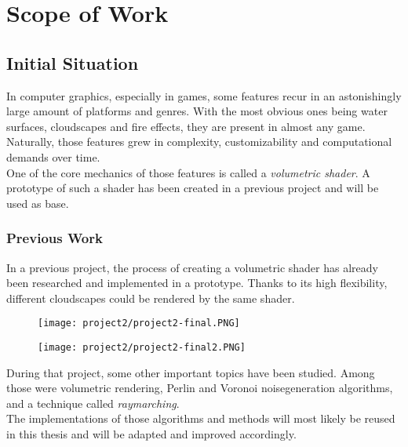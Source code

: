 \section{Scope of Work}

\subsection{Initial Situation}
In computer graphics, especially in games, some features recur in an astonishingly large amount of platforms and genres.
With the most obvious ones being water surfaces, cloudscapes and fire effects, they are present in almost any game. 
Naturally, those features grew in complexity, customizability and computational demands over time.
\\
One of the core mechanics of those features is called a \emph{\gls{volumetric} \gls{shader}}.
A prototype of such a \gls{shader} has been created in a previous project and will be used as base.

\subsubsection{Previous Work}
In a previous project, the process of creating a \gls{volumetric} \gls{shader} has already been researched and implemented in a prototype. Thanks to its high flexibility, different cloudscapes could be rendered by the same shader.

\begin{figure}[ht]
    \centering
        \begin{minipage}{0.47\linewidth}
            \texttt{[image: project2/project2-final.PNG]}
        \end{minipage}
    \hfill
        \begin{minipage}{0.47\linewidth}
            \texttt{[image: project2/project2-final2.PNG]}
        \end{minipage}  
\end{figure}

\noindent
During that project, some other important topics have been studied. Among those were \gls{volumetric} rendering, Perlin and Voronoi \gls{noisegeneration} algorithms, and a technique called \emph{\gls{raymarching}}.
\\
The implementations of those algorithms and methods will most likely be reused in this thesis and will be adapted and improved accordingly.

